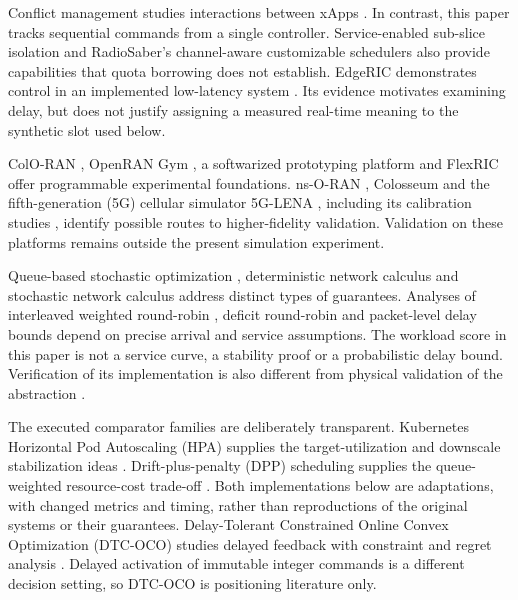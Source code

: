 \documentclass{IEEEoj}
\begin{document}
Conflict management studies interactions between xApps \cite{comix}. In contrast, this paper
tracks sequential commands from a single controller. Service-enabled sub-slice
isolation \cite{5erasi} and RadioSaber's channel-aware customizable schedulers
\cite{radiosaber} also provide capabilities that quota borrowing does not
establish. EdgeRIC demonstrates control in an implemented low-latency system
\cite{edgeric}. Its evidence motivates examining delay, but does not justify
assigning a measured real-time meaning to the synthetic slot used below.


ColO-RAN \cite{coloran}, OpenRAN Gym \cite{gym}, a softwarized prototyping platform \cite{scope} and FlexRIC
\cite{flexric} offer programmable experimental foundations. ns-O-RAN
\cite{nsoran}, Colosseum \cite{colosseum} and the fifth-generation (5G) cellular simulator 5G-LENA
\cite{lena}, including its calibration studies \cite{calibration}, identify
possible routes to higher-fidelity validation. Validation on these platforms remains outside the present simulation experiment.

Queue-based stochastic optimization \cite{neely}, deterministic network calculus
\cite{netcalc} and stochastic network calculus \cite{stochcalc} address distinct
types of guarantees. Analyses of interleaved weighted round-robin \cite{iwrr},
deficit round-robin \cite{drr} and packet-level delay bounds \cite{packetbounds}
depend on precise arrival and service assumptions. The workload score in this
paper is not a service curve, a stability proof or a probabilistic delay bound.
Verification of its implementation is also different from physical validation
of the abstraction \cite{sargent}.

The executed comparator families are deliberately transparent. Kubernetes
Horizontal Pod Autoscaling (HPA) supplies the target-utilization and downscale
stabilization ideas \cite{hpa}. Drift-plus-penalty (DPP) scheduling supplies the
queue-weighted resource-cost trade-off \cite{dppenergy}. Both implementations
below are adaptations, with changed metrics and timing, rather than reproductions
of the original systems or their guarantees. Delay-Tolerant Constrained Online
Convex Optimization (DTC-OCO) studies delayed feedback with constraint and regret
analysis \cite{dtc}. Delayed activation of immutable integer commands is a
different decision setting, so DTC-OCO is positioning literature only.
\end{document}
